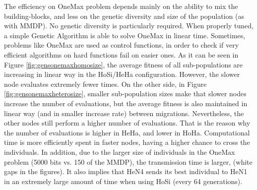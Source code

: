 The efficiency on OneMax problem depends mainly on the ability to mix
the building-blocks, and less on the genetic diversity and size of the
population (as with MMDP). No genetic diversity is particularly
required. When properly tuned, a simple Genetic Algorithm is able to
solve OneMax in linear time. Sometimes, problems like OneMax are used
as control functions, in order to check if very efficient algorithms
on hard functions fail on easier ones. As it can be seen in Figure
\ref{fig:gensonemaxhomosize}, the average fitness of all sub-populations
are increasing in linear way in the HoSi/HeHa configuration. However,
the slower node evaluates extremely fewer times.  On the other
side, in Figure \ref{fig:gensonemaxheterosize}, smaller sub-population
sizes make that slower nodes increase the number of evaluations, %
but the average fitness is also maintained in linear way (and in
smaller increase rate) between migrations. Nevertheless, the other
nodes still perform a higher number of evaluations. That is the
reason why the number of evaluations is higher in HeHa, and lower in
HoHa. Computational time is more efficiently spent in faster nodes,
having a higher chance to cross the individuals. %
 In addition, due to
the larger size of  individuals in the OneMax problem (5000 bits
vs. 150 of the MMDP), the transmission time is larger, (white gaps in the
figures). %
It also implies that HeN4 sends its best individual to
HeN1 in an extremely large amount of time when using HoSi (every 64
generations). 


\begin{table}
\caption{Results for the OneMax problem.}
\label{tab:onemaxresults}
\end{table}



